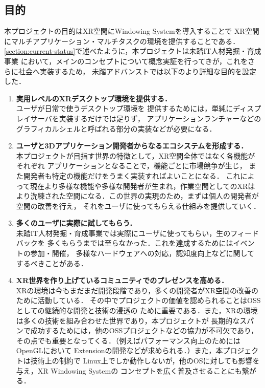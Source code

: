 \subsection{目的}
\label{section:objective}

本プロジェクトの目的はXR空間にWindowing Systemを導入することで
XR空間にマルチアプリケーション・マルチタスクの環境を提供することである．
\ref{section:current-status}で述べたように，本プロジェクトは未踏IT人材発掘・育成事業
において，メインのコンセプトについて概念実証を行ってきが，これをさらに社会へ実装するため，
未踏アドバンストでは以下のより詳細な目的を設定した．

\begin{enumerate}
  \item \textbf{実用レベルのXRデスクトップ環境を提供する．}\\
        ユーザが日常で使うデスクトップ環境を
        提供するためには，単純にディスプレイサーバを実装するだけでは足りず，
        アプリケーションランチャーなどのグラフィカルシェルと呼ばれる部分の実装などが必要になる．
  \item \textbf{ユーザと3Dアプリケーション開発者からなるエコシステムを形成する．}\\ %
        本プロジェクトが目指す世界の特徴として，XR空間全体ではなく各機能がそれぞれ
        アプリケーションとなることで，機能ごとに市場競争が生じ，
        また開発者も特定の機能だけをうまく実装すればよいことになる．
        これによって現在より多様な機能や多様な開発者が生まれ，作業空間としてのXRは
        より洗練された空間になる．この世界の実現のため，まずは個人の開発者が空間の改善を行え，
        それをユーザに使ってもらえる仕組みを提供していく．
  \item \textbf{多くのユーザに実際に試してもらう．}\\
        未踏IT人材発掘・育成事業では実際にユーザに使ってもらい，生のフィードバックを
        多くもらうまでは至らなかった．これを達成するためにはイベントの参加・開催，
        多様なハードウェアへの対応，認知度向上などに関してするべきことがある．
  \item \textbf{XR世界を作り上げているコミュニティでのプレゼンスを高める．}\\
        XRの環境は今もまだまだ開発段階であり，多くの開発者がXR空間の改善のために活動している．
        その中でプロジェクトの価値を認められることはOSSとしての継続的な開発と技術の浸透の
        ために重要である．また，XRの環境は多くの技術を組み合わせた世界であり，本プロジェクトが
        長期的なスパンで成功するためには，他のOSSプロジェクトなどの協力が不可欠であり，
        その点でも重要となってくる．（例えばパフォーマンス向上のためにはOpenGLにおいて
        Extensionの開発などが求められる．）また，本プロジェクトは技術上の制約で
        Linux上でしか動作しないが，他のOSに対しても影響を与え，XR Windowing Systemの
        コンセプトを広く普及させることにも繋がる．
\end{enumerate}
